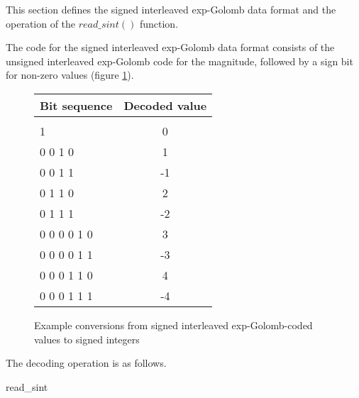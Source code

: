 \label{segol}

This section defines the signed interleaved exp-Golomb data format and the operation
of the $read\_sint()$ function.

The code for the signed interleaved exp-Golomb data format consists of the
unsigned interleaved exp-Golomb code for the magnitude, followed by a sign bit
for non-zero values (figure \ref{segolcodings}).

\begin{figure}[h]
\begin{tabular}{l|c}
Bit sequence & Decoded value \\
\hline\\
1                 &  0\\
0 0 1 0           &  1\\
0 0 1 1           &  -1\\
0 1 1 0            &  2\\
0 1 1 1            &  -2\\
0 0 0 0 1 0         &  3\\
0 0 0 0 1 1         &  -3\\
0 0 0 1 1 0         &  4\\
0 0 0 1 1 1         &  -4\\

\end{tabular}

\caption{Example conversions from signed interleaved exp-Golomb-coded values 
to signed integers \label{segolcodings}}
\end{figure}

The decoding operation is as follows.

\begin{pseudo}{read\_sint}{}
\bsEND
{}

\end{pseudo}
